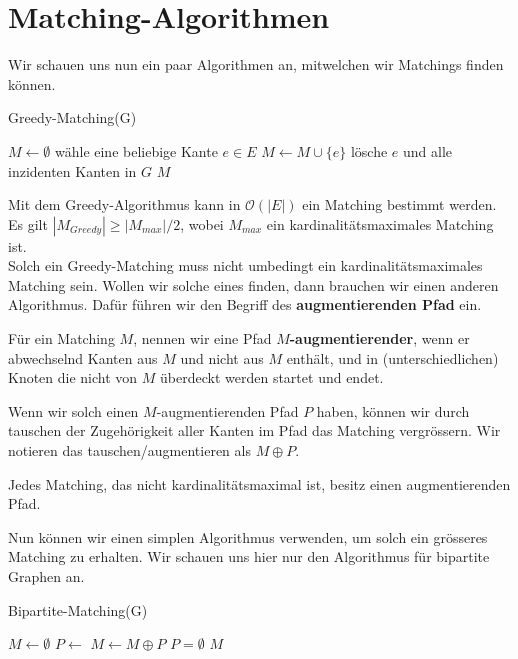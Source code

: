 \section{Matching-Algorithmen}

Wir schauen uns nun ein paar Algorithmen an, mitwelchen wir Matchings finden können.

\begin{algorithm}
    \caption{Greedy-Matching(G)}
    \begin{algorithmic}[1]
        \State $M \leftarrow \emptyset$
            \State wähle eine beliebige Kante $e \in E$
            \State $ M \leftarrow M \cup \{e\}$
            \State lösche $e$ und alle inzidenten Kanten in $G$
        \EndWhile
        \State \Return $M$
    \end{algorithmic}
\end{algorithm}

Mit dem Greedy-Algorithmus kann in $\mathcal{O}(|E|)$ ein Matching bestimmt werden. Es gilt
$|M_{Greedy}| \geq |M_{max}| / 2$, wobei $M_{max}$ ein kardinalitätsmaximales Matching ist. \\

Solch ein Greedy-Matching muss nicht umbedingt ein kardinalitätsmaximales Matching sein. Wollen wir solche eines finden, dann
brauchen wir einen anderen Algorithmus. Dafür führen wir den Begriff des \textbf{augmentierenden Pfad} ein.
\begin{definition}
    Für ein Matching $M$, nennen wir eine Pfad \textbf{$M$-augmentierender}, wenn er abwechselnd Kanten
    aus $M$ und nicht aus $M$ enthält, und in (unterschiedlichen) Knoten die nicht von $M$ überdeckt werden startet und endet.
\end{definition}
\bigskip

Wenn wir solch einen $M$-augmentierenden Pfad $P$ haben, können wir durch tauschen der Zugehörigkeit aller Kanten im Pfad das Matching
vergrössern. Wir notieren das tauschen/augmentieren als $M \oplus P$.

\begin{satz}
    Jedes Matching, das nicht kardinalitätsmaximal ist, besitz einen augmentierenden Pfad.
\end{satz}
\bigskip

Nun können wir einen simplen Algorithmus verwenden, um solch ein grösseres Matching zu erhalten. Wir schauen
uns hier nur den Algorithmus für bipartite Graphen an.

\begin{algorithm}
    \caption{Bipartite-Matching(G)}
    \begin{algorithmic}[1]
        \State $M \leftarrow \emptyset$
        \Repeat
            \State $P \leftarrow$ 
            \State $M \leftarrow M \oplus P$
        \Until $P = \emptyset$
        \State \Return $M$
    \end{algorithmic}
\end{algorithm}

